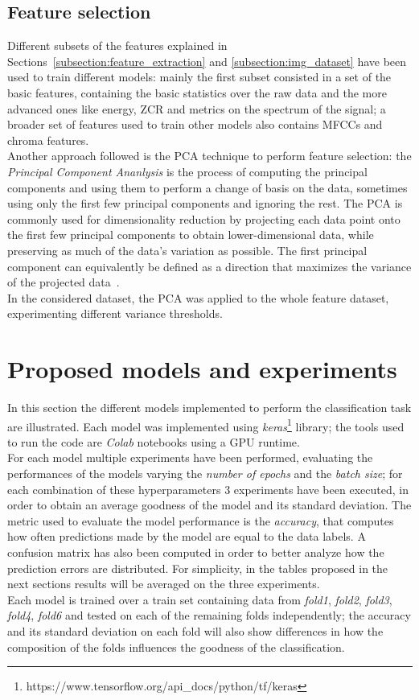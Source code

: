 \documentclass[oneside,openany]{article}
\begin{document}
    \subsection{Feature selection}
    \label{subsection:feature_selection}
    Different subsets of the features explained in Sections~\ref{subsection:feature_extraction} and \ref{subsection:img_dataset} have been used to train different models: mainly the first subset consisted in a set of the basic features, containing the basic statistics over the raw data and the more advanced ones like energy, ZCR and metrics on the spectrum of the signal; a broader set of features used to train other models also contains MFCCs and chroma features.\\
    Another approach followed is the PCA technique to perform feature selection: the \textit{Principal Component Ananlysis} is the process of computing the principal components and using them to perform a change of basis on the data, sometimes using only the first few principal components and ignoring the rest. The PCA is commonly used for dimensionality reduction by projecting each data point onto the first few principal components to obtain lower-dimensional data, while preserving as much of the data's variation as possible. The first principal component can equivalently be defined as a direction that maximizes the variance of the projected data~\cite{pca}.\\ 
    In the considered dataset, the PCA was applied to the whole feature dataset, experimenting different variance thresholds.
    
    \section{Proposed models and experiments}
    \label{section:models}
    In this section the different models implemented to perform the classification task are illustrated. Each model was implemented using \textit{keras}\footnote{https://www.tensorflow.org/api_docs/python/tf/keras} library; the tools used to run the code are \textit{Colab} notebooks using a GPU runtime.\\
    For each model multiple experiments have been performed, evaluating the performances of the models varying the \textit{number of epochs} and the \textit{batch size}; for each combination of these hyperparameters $3$ experiments have been executed, in order to obtain an average goodness of the model and its standard deviation. The metric used to evaluate the model performance is the \textit{accuracy}, that computes how often predictions made by the model are equal to the data labels. A confusion matrix has also been computed in order to better analyze how the prediction errors are distributed.
    For simplicity, in the tables proposed in the next sections results will be averaged on the three experiments.\\
    Each model is trained over a train set containing data from \textit{fold1}, \textit{fold2}, \textit{fold3}, \textit{fold4}, \textit{fold6} and tested on each of the remaining folds independently; the accuracy and its standard deviation on each fold will also show differences in how the composition of the folds influences the goodness of the classification.
    
\end{document}
